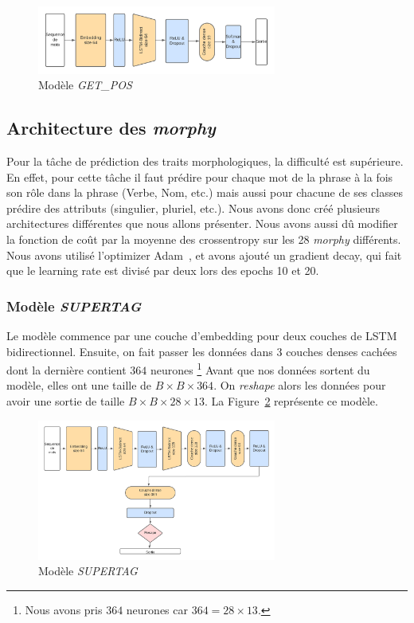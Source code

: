 \documentclass[a4paper]{article}
\begin{document}
\begin{figure}[H]
    \centering
    \includegraphics[width=0.7\textwidth]{get_pos.png}
    \caption{Modèle \textit{GET\_POS}}
    \label{fig: model getpos}
\end{figure} 

\subsection{Architecture des \textit{morphy}}

Pour la tâche de prédiction des traits morphologiques, la difficulté est supérieure. En effet, pour cette tâche 
il faut prédire pour chaque mot de la phrase à la fois son rôle dans la phrase (Verbe, Nom, etc.) mais aussi 
pour chacune de ses classes prédire des attributs (singulier, pluriel, etc.). Nous avons donc créé plusieurs 
architectures différentes que nous allons présenter. Nous avons aussi dû modifier la fonction de coût par 
la moyenne des crossentropy sur les 28 \textit{morphy} différents. Nous avons utilisé l'optimizer Adam~\cite{kingma2014adam},
et avons ajouté un gradient decay, qui fait que le learning rate est divisé par deux lors des epochs 10 et 20.

\subsubsection{Modèle \textit{SUPERTAG}}

Le modèle commence par une couche d'embedding pour deux couches de LSTM bidirectionnel. Ensuite, on fait passer les données 
dans 3 couches denses cachées dont la dernière contient $364$ neurones
\footnote{Nous avons pris $364$ neurones car $364 = 28 \times 13$.}
Avant que nos données sortent du modèle, elles ont une
taille de $B \times B \times 364$. On \textit{reshape} alors les données pour avoir une sortie de taille 
$B \times B \times 28 \times 13$. La Figure~\ref{fig: model supertag} représente ce modèle.

\begin{figure}[H]
    \centering
    \includegraphics[width=0.7\textwidth]{get_morphy_supertag.png}
    \caption{Modèle \textit{SUPERTAG}}
    \label{fig: model supertag}
\end{figure}
\end{document}
